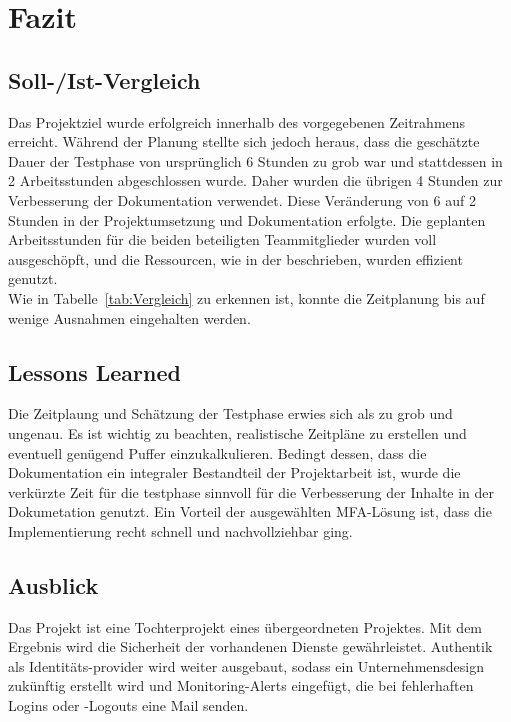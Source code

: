 \section{Fazit} 
\label{sec:Fazit}

\subsection{Soll-/Ist-Vergleich}
\label{sec:SollIstVergleich}
Das Projektziel wurde erfolgreich innerhalb des vorgegebenen Zeitrahmens erreicht. Während der Planung stellte sich jedoch heraus, dass die 
geschätzte Dauer der Testphase von ursprünglich 6 Stunden zu grob war und stattdessen in 2 Arbeitsstunden abgeschlossen wurde. Daher wurden die 
übrigen 4 Stunden zur Verbesserung der Dokumentation verwendet. Diese Veränderung von 6 auf 2 Stunden in der Projektumsetzung und Dokumentation 
erfolgte. Die geplanten Arbeitsstunden für die beiden beteiligten Teammitglieder wurden voll ausgeschöpft, und die Ressourcen, wie in der 
 beschrieben, wurden effizient genutzt.
\\Wie in Tabelle~\ref{tab:Vergleich}  zu erkennen ist, konnte die Zeitplanung bis auf wenige Ausnahmen eingehalten werden.

\subsection{Lessons Learned}
\label{sec:LessonsLearned}
Die Zeitplaung und Schätzung der Testphase erwies sich als zu grob und ungenau. Es ist wichtig zu beachten, realistische Zeitpläne zu erstellen 
und eventuell genügend Puffer einzukalkulieren. Bedingt dessen, dass die Dokumentation ein integraler Bestandteil der Projektarbeit ist, 
wurde die verkürzte Zeit für die testphase sinnvoll für die Verbesserung der Inhalte in der Dokumetation genutzt. Ein Vorteil der 
ausgewählten MFA-Lösung ist, dass die Implementierung recht schnell und nachvollziehbar ging.

\subsection{Ausblick}
\label{sec:Ausblick}
Das Projekt ist eine Tochterprojekt eines übergeordneten Projektes. Mit dem Ergebnis wird die Sicherheit der vorhandenen Dienste gewährleistet. 
Authentik als Identitäts-provider wird weiter ausgebaut, sodass ein Unternehmensdesign zukünftig erstellt wird und Monitoring-Alerts eingefügt, 
die bei fehlerhaften Logins oder -Logouts eine Mail senden.
